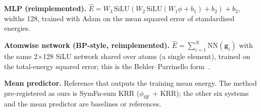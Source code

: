 \textbf{MLP (reimplemented).} $\hat E=W_3\,\mathrm{SiLU}(W_2\,\mathrm{SiLU}(W_1\phi+b_1)+b_2)+b_3$, widths 128, trained with Adam on the mean squared error of standardised energies.

\textbf{Atomwise network (BP-style, reimplemented).} $\hat E=\sum_{i=1}^{N}\mathrm{NN}(\mathbf g_i)$ with the same 2$\times$128 SiLU network shared over atoms (a single element), trained on the total-energy squared error; this is the Behler--Parrinello form~\cite{behler2007generalized}.

\textbf{Mean predictor.} Reference that outputs the training mean energy. The method pre-registered as ours is SymFn-sum KRR ($\phi_{\text{SF}}$ + KRR); the other six systems and the mean predictor are baselines or references.

